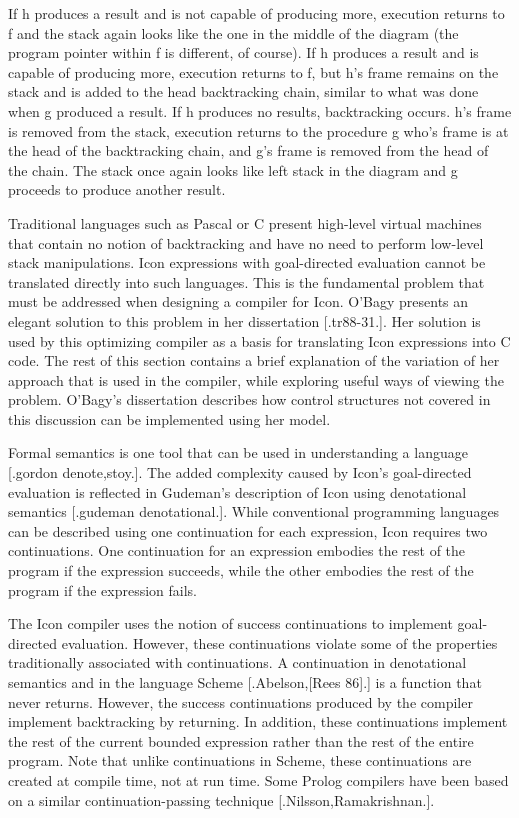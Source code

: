 If h produces a result and is not capable of producing more, execution
returns to f and the stack again looks like the one in the middle of
the diagram (the program pointer within f is different, of course). If
h produces a result and is capable of producing more, execution
returns to f, but h's frame remains on the stack and is added to the
head backtracking chain, similar to what was done when g produced a
result. If h produces no results, backtracking occurs.  h's frame is
removed from the stack, execution returns to the procedure g who's
frame is at the head of the backtracking chain, and g's frame is
removed from the head of the chain. The stack once again looks like
left stack in the diagram and g proceeds to produce another result.


Traditional languages such as Pascal or C present high-level virtual
machines that contain no notion of backtracking and have no need to
perform low-level stack manipulations. Icon expressions with
goal-directed evaluation cannot be translated directly into such
languages. This is the fundamental problem that must be addressed when
designing a compiler for Icon. O'Bagy presents an elegant solution to
this problem in her dissertation [.tr88-31.]. Her solution is used by
this optimizing compiler as a basis for translating Icon expressions
into C code. The rest of this section contains a brief explanation of
the variation of her approach that is used in the compiler, while
exploring useful ways of viewing the problem. O'Bagy's dissertation
describes how control structures not covered in this discussion can be
implemented using her model.

Formal semantics is one tool that can be used in understanding a
language [.gordon denote,stoy.]. The added complexity caused by Icon's
goal-directed evaluation is reflected in Gudeman's description of Icon
using denotational semantics [.gudeman denotational.]. While
conventional programming languages can be described using one
continuation for each expression, Icon requires two continuations. One
continuation for an expression embodies the rest of the program if the
expression succeeds, while the other embodies the rest of the program
if the expression fails.

The Icon compiler uses the notion of success continuations to
implement goal-directed evaluation. However, these continuations
violate some of the properties traditionally associated with
continuations. A continuation in denotational semantics and in the
language Scheme [.Abelson,[Rees 86].] is a function that never
returns. However, the success continuations produced by the compiler
implement backtracking by returning. In addition, these continuations
implement the rest of the current bounded expression rather than the
rest of the entire program. Note that unlike continuations in Scheme,
these continuations are created at compile time, not at run time. Some
Prolog compilers have been based on a similar continuation-passing
technique [.Nilsson,Ramakrishnan.].

